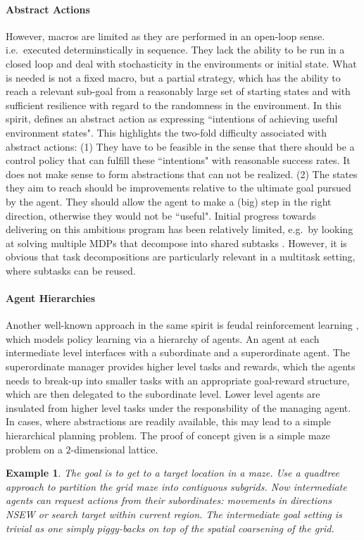 \documentclass{article}
\newtheorem{example}{Example}
\begin{document}
\newpage


\paragraph{Abstract Actions \cite{singh1992scaling}} However, macros are limited as they are performed in an open-loop sense. i.e.~executed determinstically in sequence. They lack  the ability to be run in a closed loop and deal with stochasticity in the environments or initial state. What is needed is not a fixed macro, but a partial strategy, which has the ability to reach a relevant sub-goal from a reasonably large set of starting states and with sufficient resilience with regard to the randomness in the environment. In this spirit,  \cite{singh1992scaling} defines an abstract action as expressing ``intentions of achieving useful environment states". This highlights the two-fold difficulty associated with abstract actions: (1) They have to be feasible in the sense that there should be a control policy that can fulfill these ``intentions" with reasonable success rates. It does not make sense to form abstractions that can not be realized. (2) The states they aim to reach should be improvements relative to the ultimate goal pursued by the agent. They should allow the agent to make a (big) step in the right direction, otherwise they would not be ``useful". Initial progress towards delivering on this ambitious program has been relatively limited, e.g.~by looking at solving multiple MDPs that decompose into shared subtasks \cite{singh1992scaling}. However, it is obvious that task decompositions are particularly relevant in a multitask setting, where subtasks can be reused. 


\paragraph{Agent Hierarchies \cite{dayan1993feudal}} Another well-known approach in the same spirit is feudal reinforcement learning \cite{dayan1993feudal}, which models policy learning via a  hierarchy of agents. An agent at each intermediate level interfaces with a subordinate and a superordinate agent. The superordinate manager provides higher level tasks and rewards, which the agents needs to break-up into smaller tasks with an appropriate goal-reward structure, which are then delegated to the subordinate level. Lower level agents are insulated from higher level tasks under the responsbility of the managing agent. In cases, where abstractions are readily available, this may lead to a simple hierarchical planning problem. The proof of concept given is  a simple maze problem on a $2$-dimensional lattice. 
\begin{example}
The goal is to get to  a target location in a maze. Use a quadtree approach to partition the grid maze into contiguous subgrids. Now intermediate agents can request actions from their subordinates: movements in directions NSEW or search target within current region. The intermediate goal setting is trivial as one simply piggy-backs on top of the spatial coarsening of the grid. 
\end{example}
\end{document}
